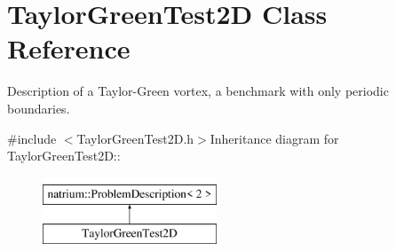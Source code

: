 \hypertarget{classTaylorGreenTest2D}{
\section{TaylorGreenTest2D Class Reference}
\label{classTaylorGreenTest2D}
}


Description of a Taylor-\/Green vortex, a benchmark with only periodic boundaries.  


{\ttfamily \#include $<$TaylorGreenTest2D.h$>$}Inheritance diagram for TaylorGreenTest2D::\begin{figure}[H]
\begin{center}
\leavevmode
\includegraphics[height=2cm]{classTaylorGreenTest2D}
\end{center}
\end{figure}
